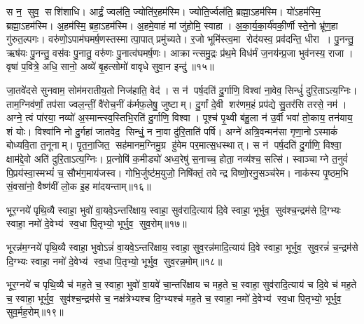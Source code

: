 स न॒ सुव॒ सशि॑शाधि। आर्द्रं॒ ज्वल॑ति॒ ज्योति॑र॒हम॑स्मि। ज्योति॒र्ज्वल॑ति॒ ब्रह्मा॒ऽहम॑स्मि। यो॑ऽहम॑स्मि॒ ब्रह्मा॒ऽहम॑स्मि। अ॒हम॑स्मि॒ ब्रहा॒ऽहम॑स्मि। अ॒हमे॒वाहं मां जु॑होमि॒ स्वाहा। अ॒का॒र्य॒का॒र्य॑वकी॒र्णी स्ते॒नो भ्रू॑ण॒हा गु॑रुत॒ल्पगः। वरु॑णो॒ऽपाम॑घ\-मर्\mbox{}ष॒णस्तस्मात्पा॒पात् प्रमु॑च्यते। र॒जो भूमि॑स्त्व॒मा रोद॑यस्व॒ प्रव॑दन्ति॒ धीरा। पु॒नन्तु॒ ऋष॑यः पु॒नन्तु॒ वस॑वः पु॒नातु॒ वरु॑णः पु॒नात्व॑घमर्\mbox{}ष॒णः। आक्रान्त्समु॒द्रः प्र॑थ॒मे विध॑र्मं ज॒नय॑न्प्र॒जा भुव॑नस्य॒ राजा। वृषा॑ प॒वित्रे॒ अधि॒ सानो॒ अव्ये॑ बृ॒हत्सोमो॑ वावृधे सुवा॒न इन्दु॑॥१५॥
\anuvakamend

 जा॒तवे॑दसे सुनवाम॒ सोम॑मरातीय॒तो निज॑हाति॒ वेद॑। स न॑ पर्\mbox{}ष॒दति॑ दु॒र्गाणि॒ विश्वा॑ ना॒वेव॒ सिन्धुं॑ दुरि॒ताऽत्य॒ग्निः। ताम॒ग्निव॑र्णां॒ तप॑सा ज्वल॒न्तीं॒ वै॑रोच॒नीं क॑र्मफ॒लेषु॒ जुष्टाम्। दु॒र्गां दे॒वी शर॑णम॒हं प्रप॑द्ये सु॒तर॑सि तरसे॒ नम॑। अग्ने॒ त्वं पा॑रया॒ नव्यो॑ अ॒स्मान्त्स्व॒स्तिभि॒रति॑ दु॒र्गाणि॒ विश्वा। पूश्च॑ पृ॒थ्वी ब॑हु॒ला न॑ उ॒र्वी भवा॑ तो॒काय॒ तन॑याय॒ शं योः। विश्वा॑नि नो दु॒र्गहा॑ जातवेद॒ सिन्धुं॒ न ना॒वा दु॑रि॒ताति॑ पर्\mbox{}षि। अग्ने॑ अत्रि॒वन्मन॑सा गृणा॒नोऽस्माकं॑ बोध्यवि॒ता त॒नूनाम्। पृ॒त॒ना॒जित॒ सह॑मानम॒ग्निमु॒ग्र हु॑वेम पर॒मात्स॒धस्थात्। स न॑ पर्\mbox{}ष॒दति॑ दु॒र्गाणि॒ विश्वा॒ क्षाम॑द्दे॒वो अति॑ दुरि॒ताऽत्य॒ग्निः। प्र॒त्नोषि॑ क॒मीड्यो॑ अध्व॒रेषु॑ स॒नाच्च॒ होता॒ नव्य॑श्च॒ सत्सि॑। स्वाञ्चाग्ने त॒नुवं॑ पि॒प्रय॑स्वा॒स्मभ्यं॑ च॒ सौभ॑ग॒माय॑जस्व। गोभि॒र्जुष्ट॑म॒युजो॒ निषि॑क्तं॒ तवेन्द्र विष्णो॒रनु॒सञ्च॑रेम। नाक॑स्य पृ॒ष्ठम॒भि सं॒वसा॑नो॒ वैष्ण॑वीं लो॒क इ॒ह मा॑दयन्ताम्॥१६॥
\anuvakamend%


भूर॒ग्नये॑ पृथि॒व्यै स्वाहा॒ भुवो॑ वा॒यवे॒ऽन्तरि॑क्षाय॒ स्वाहा॒ सुव॑रादि॒त्याय॑ दि॒वे स्वाहा॒ भूर्भुव॒ सुव॑श्च॒न्द्रम॑से दि॒ग्भ्यः स्वाहा॒ नमो॑ दे॒वेभ्य॑ स्व॒धा पि॒तृभ्यो॒ भूर्भुव॒ सुव॒रोम्॥१७॥
\anuvakamend


भूरन्न॑म॒ग्नये॑ पृथि॒व्यै स्वाहा॒ भुवोऽन्नं॑ वा॒यवे॒ऽन्तरि॑क्षाय॒ स्वाहा॒ सुव॒रन्न॑मादि॒त्याय॑ दि॒वे स्वाहा॒ भूर्भुव॒ सुव॒रन्नं॑ च॒न्द्रम॑से दि॒ग्भ्यः स्वाहा॒ नमो॑ दे॒वेभ्य॑ स्व॒धा पि॒तृभ्यो॒ भूर्भुव॒ सुव॒रन्न॒मोम्॥१८॥
\anuvakamend


भूर॒ग्नये॑ च पृथि॒व्यै च॑ मह॒ते च॒ स्वाहा॒ भुवो॑ वा॒यवे॑ चा॒न्तरि॑क्षाय च मह॒ते च॒ स्वाहा॒ सुव॑रादि॒त्याय॑ च दि॒वे च॑ मह॒ते च॒ स्वाहा॒ भूर्भुव॒ सुव॑श्च॒न्द्रम॑से च॒ नक्ष॑त्रेभ्यश्च दि॒ग्भ्यश्च॑ मह॒ते च॒ स्वाहा॒ नमो॑ दे॒वेभ्य॑ स्व॒धा पि॒तृभ्यो॒ भूर्भुव॒ सुव॒र्मह॒रोम्॥१९॥ %
\anuvakamend


